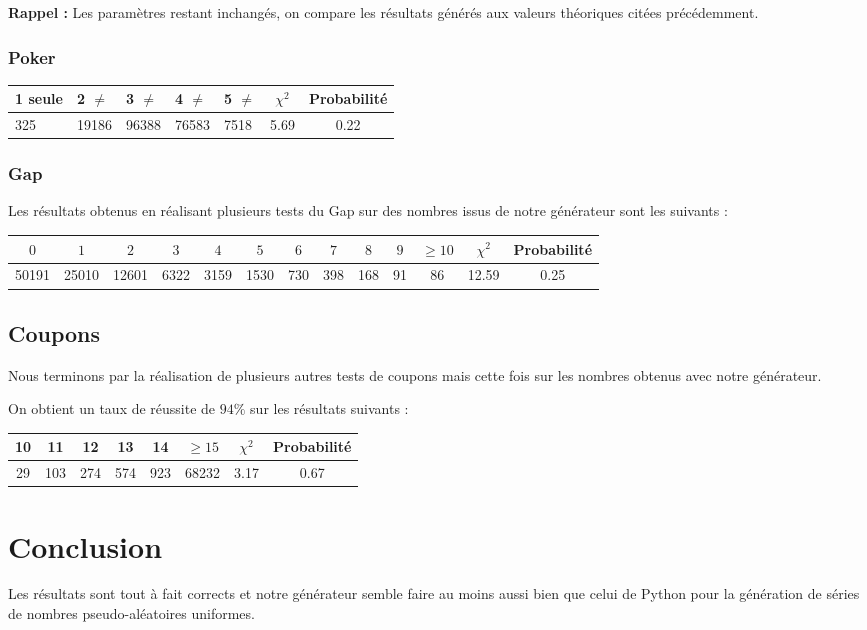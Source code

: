 \documentclass[12pt,a4paper]{article}
\begin{document}
\textbf{Rappel :} Les paramètres restant inchangés, on compare
les résultats générés aux valeurs théoriques citées précédemment.
\subsubsection{Poker}

\begin{center}
\begin{tabular}{l|l|l|l|l|c|c}
1 seule & 2 $\neq$ & 3 $\neq$ & 4 $\neq$ & 5 $\neq$
	& $\chi^2$ & Probabilité \\ \hline
325 & 19186 & 96388 & 76583 & 7518 &  5.69 &  0.22
\end{tabular}
\end{center}

\subsubsection{Gap}

Les résultats obtenus en réalisant plusieurs tests du Gap sur des nombres issus
de notre générateur sont les suivants :

\begin{center}
\begin{tabular}{c|c|c|c|c|c|c|c|c|c|c|c|c}
$0$ & $1$ & $2$ & $3$ & $4$ & $5$ & $6$ & $7$ & $8$ & $9$ & $\geq 10$ &
	$\chi^2$ & Probabilité \\ \hline
50191 & 25010 & 12601 & 6322 & 3159 & 1530 & 730 & 398 & 168 & 91 & 86 &
	12.59 &  0.25
\end{tabular}
\end{center}

\subsection{Coupons}

Nous terminons par la réalisation de plusieurs autres tests de coupons mais
cette fois sur les nombres obtenus avec notre générateur.

On obtient un taux de réussite de $94\%$ sur les résultats suivants :

\begin{center}
\begin{tabular}{c|c|c|c|c|c|c|c}
10 & 11 & 12 & 13 & 14 & $\geq 15$ & $\chi^2$ & Probabilité \\ \hline
29 & 103 & 274 & 574 & 923 & 68232 &  3.17 &  0.67
\end{tabular}
\end{center}


\section{Conclusion}
Les résultats sont tout à fait corrects et notre générateur semble faire
au moins aussi bien que celui de Python pour la génération de séries de nombres
pseudo-aléatoires uniformes.
\end{document}
